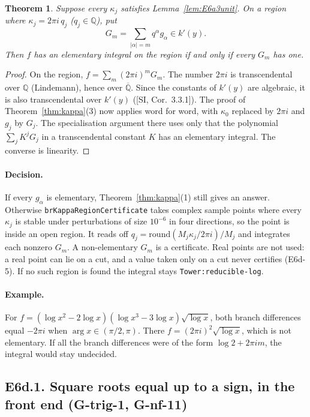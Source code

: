 \documentclass[11pt]{article}
\newtheorem{theorem}{Theorem}[section]
\theoremstyle{definition}
\theoremstyle{remark}
\newcommand{\Q}{\mathbb{Q}}
\newcommand{\Qbar}{\overline{\mathbb{Q}}}
\newcommand{\code}[1]{\texttt{#1}}
\begin{document}
\begin{theorem}\label{thm:E6a3}
Suppose every $\kappa_j$ satisfies Lemma~\ref{lem:E6a3unit}. On a region where
$\kappa_j=2\pi i\,q_j$ ($q_j\in\Q$), put
\[ G_m=\sum_{|\alpha|=m}q^\alpha g_\alpha\in k'(y). \]
Then $f$ has an elementary integral on the region if and only if every $G_m$
has one.
\end{theorem}

\begin{proof}
On the region, $f=\sum_m(2\pi i)^mG_m$. The number $2\pi i$ is transcendental
over $\Q$ (Lindemann), hence over $\Qbar$. Since the constants of $k'(y)$ are
algebraic, it is also transcendental over $k'(y)$ ([SI, Cor.~3.3.1]). The proof
of Theorem~\ref{thm:kappa}(3) now applies word for word, with $\kappa_0$
replaced by $2\pi i$ and $g_j$ by $G_j$. The specialisation argument there
uses only that the polynomial $\sum_jK^jG_j$ in a transcendental constant $K$
has an elementary integral. The converse is linearity.
\end{proof}

\paragraph{Decision.} If every $g_\alpha$ is elementary, Theorem~\ref{thm:kappa}(1)
still gives an answer. Otherwise \code{brKappaRegionCertificate} takes complex
sample points where every $\kappa_j$ is stable under perturbations of size
$10^{-6}$ in four directions, so the point is inside an open region. It reads
off $q_j=\mathrm{round}(M_j\kappa_j/2\pi i)/M_j$ and integrates each nonzero
$G_m$. A non-elementary $G_m$ is a certificate. Real points are not used: a
real point can lie on a cut, and a value taken only on a cut never certifies
(E6d-5). If no such region is found the integral stays \code{Tower:reducible-log}.

\paragraph{Example.} For
$f=(\log x^2-2\log x)(\log x^3-3\log x)\sqrt{\log x}$, both branch differences
equal $-2\pi i$ when $\arg x\in(\pi/2,\pi)$. There $f=(2\pi i)^2\sqrt{\log x}$,
which is not elementary. If all the branch differences were of the form
$\log 2+2\pi im$, the integral would stay undecided.

\subsection*{E6d.1. Square roots equal up to a sign, in the front end (G-trig-1, G-nf-11)}
\end{document}
